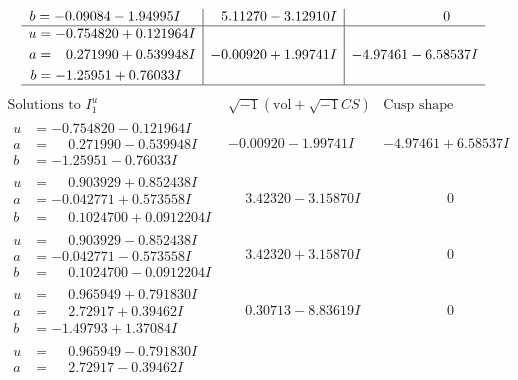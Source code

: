 \documentclass[1p]{elsarticle_modified}
\theoremstyle{definition}
\newcommand{\I}{\sqrt{-1}}
\begin{document}
$$\begin{array}{c|c|c}
\begin{aligned}
b &= -0.09084 - 1.94995 I\end{aligned}
 & \phantom{-}5.11270 - 3.12910 I & \phantom{-0.000000 } 0 \\ \hline\begin{aligned}
u &= -0.754820 + 0.121964 I \\
a &= \phantom{-}0.271990 + 0.539948 I \\
b &= -1.25951 + 0.76033 I\end{aligned}
 & -0.00920 + 1.99741 I & -4.97461 - 6.58537 I\\
 \hline 
 \end{array}$$\newpage$$\begin{array}{c|c|c}  
\text{Solutions to }I^u_{1}& \I (\text{vol} + \sqrt{-1}CS) & \text{Cusp shape}\\
 \hline 
\begin{aligned}
u &= -0.754820 - 0.121964 I \\
a &= \phantom{-}0.271990 - 0.539948 I \\
b &= -1.25951 - 0.76033 I\end{aligned}
 & -0.00920 - 1.99741 I & -4.97461 + 6.58537 I \\ \hline\begin{aligned}
u &= \phantom{-}0.903929 + 0.852438 I \\
a &= -0.042771 + 0.573558 I \\
b &= \phantom{-}0.1024700 + 0.0912204 I\end{aligned}
 & \phantom{-}3.42320 - 3.15870 I & \phantom{-0.000000 } 0 \\ \hline\begin{aligned}
u &= \phantom{-}0.903929 - 0.852438 I \\
a &= -0.042771 - 0.573558 I \\
b &= \phantom{-}0.1024700 - 0.0912204 I\end{aligned}
 & \phantom{-}3.42320 + 3.15870 I & \phantom{-0.000000 } 0 \\ \hline\begin{aligned}
u &= \phantom{-}0.965949 + 0.791830 I \\
a &= \phantom{-}2.72917 + 0.39462 I \\
b &= -1.49793 + 1.37084 I\end{aligned}
 & \phantom{-}0.30713 - 8.83619 I & \phantom{-0.000000 } 0 \\ \hline\begin{aligned}
u &= \phantom{-}0.965949 - 0.791830 I \\
a &= \phantom{-}2.72917 - 0.39462 I \\

\end{aligned}
\end{array}$$
\end{document}
